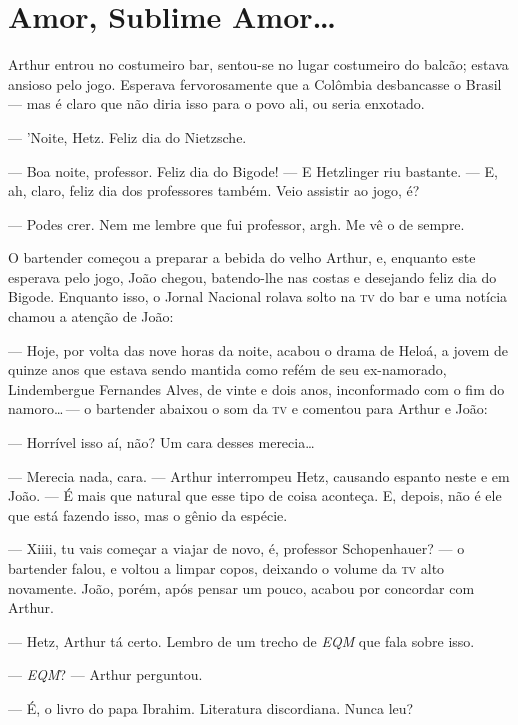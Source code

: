 \chapter{Amor, Sublime Amor\ldots}

Arthur entrou no costumeiro bar, sentou-se no lugar costumeiro do balcão; estava ansioso pelo jogo. Esperava fervorosamente que a Colômbia desbancasse o Brasil --- mas é claro que não diria isso para o povo ali, ou seria enxotado.

--- 'Noite, Hetz. Feliz dia do Nietzsche.

--- Boa noite, professor. Feliz dia do Bigode! --- E Hetzlinger riu bastante. --- E, ah, claro, feliz dia dos professores também. Veio assistir ao jogo, é?

--- Podes crer. Nem me lembre que fui professor, argh. Me vê o de sempre.

O bartender começou a preparar a bebida do velho Arthur, e, enquanto este esperava pelo jogo, João chegou, batendo-lhe nas costas e desejando feliz dia do Bigode. Enquanto isso, o Jornal Nacional rolava solto na \textsc{tv} do bar e uma notícia chamou a atenção de João:

--- Hoje, por volta das nove horas da noite, acabou o drama de Heloá, a jovem de quinze anos que estava sendo mantida como refém de seu ex-namorado, Lindembergue Fernandes Alves, de vinte e dois anos, inconformado com o fim do namoro\ldots\,--- o bartender abaixou o som da \textsc{tv} e comentou para Arthur e João:

--- Horrível isso aí, não? Um cara desses merecia\ldots

--- Merecia nada, cara. --- Arthur interrompeu Hetz, causando espanto neste e em João. --- É mais que natural que esse tipo de coisa aconteça. E, depois, não é ele que está fazendo isso, mas o gênio da espécie.

--- Xiiii, tu vais começar a viajar de novo, é, professor Schopenhauer? --- o bartender falou, e voltou a limpar copos, deixando o volume da \textsc{tv} alto novamente. João, porém, após pensar um pouco, acabou por concordar com Arthur.

--- Hetz, Arthur tá certo. Lembro de um trecho de \emph{EQM} que fala sobre isso.

--- \emph{EQM}? --- Arthur perguntou.

\begin{sloppypar}
--- É, o livro do papa Ibrahim. Literatura discordiana. Nunca leu?
\end{sloppypar}

